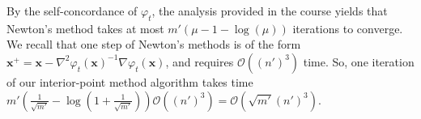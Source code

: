 \documentclass{article}
\begin{document}
\begin{itemize}
           By the self-concordance of $\varphi_{t}$, 
           the analysis provided in the course
           yields that Newton's method
           takes at most $m'\left(\mu-1-\log\left(\mu\right)\right)$ 
           iterations to converge.
           We recall that one step of Newton's methods
           is of the form $\mathbf{x}^{+} = 
           \mathbf{x} - \nabla^{2}\varphi_{t}\left(\mathbf{x}\right)^{-1}
           \nabla \varphi_{t}\left(\mathbf{x}\right)$,
           and requires $\mathcal{O} \left(\left(n'\right)^{3}\right)$
           time.
           So, one iteration of our interior-point method
           algorithm takes time
           $m'\left(\frac{1}{\sqrt{m'}} - \log\left(1 + \frac{1}{\sqrt{m'}}\right)\right)
           \mathcal{O} \left(\left(n'\right)^{3}\right) =
           \mathcal{O} \left(\sqrt{m'} \left(n'\right)^{3}\right)$.
   \end{itemize}
 
\end{document}
